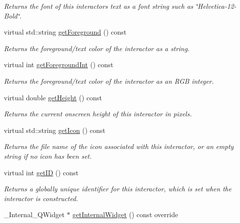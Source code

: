 \begin{DoxyCompactItemize}
\begin{DoxyCompactList}\small\item\em Returns the font of this interactor\textquotesingle{}s text as a font string such as \char`\"{}\+Helvetica-\/12-\/\+Bold\char`\"{}. \end{DoxyCompactList}\item 
virtual std\+::string \mbox{\hyperlink{classGInteractor_a4fa2d8b0192a3a5b4af4bbfe71194d03}{get\+Foreground}} () const
\begin{DoxyCompactList}\small\item\em Returns the foreground/text color of the interactor as a string. \end{DoxyCompactList}\item 
virtual int \mbox{\hyperlink{classGInteractor_ac3b12ab385a6ef9ae90fc879860ba726}{get\+Foreground\+Int}} () const
\begin{DoxyCompactList}\small\item\em Returns the foreground/text color of the interactor as an R\+GB integer. \end{DoxyCompactList}\item 
virtual double \mbox{\hyperlink{classGInteractor_a1e7e353362434072875264cf95629f99}{get\+Height}} () const
\begin{DoxyCompactList}\small\item\em Returns the current onscreen height of this interactor in pixels. \end{DoxyCompactList}\item 
virtual std\+::string \mbox{\hyperlink{classGInteractor_aaed62a73004939a64da6f0eb9eb64d73}{get\+Icon}} () const
\begin{DoxyCompactList}\small\item\em Returns the file name of the icon associated with this interactor, or an empty string if no icon has been set. \end{DoxyCompactList}\item 
virtual int \mbox{\hyperlink{classGInteractor_a9c9659a6c6ba66b4107ba59c95a24241}{get\+ID}} () const
\begin{DoxyCompactList}\small\item\em Returns a globally unique identifier for this interactor, which is set when the interactor is constructed. \end{DoxyCompactList}\item 
\+\_\+\+Internal\+\_\+\+Q\+Widget $\ast$ \mbox{\hyperlink{classGSpacer_a2f6b36b2517087dc90a366b5ce1f5323}{get\+Internal\+Widget}} () const override

\end{DoxyCompactItemize}
